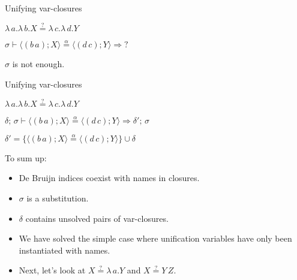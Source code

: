 \documentclass[pdf]{beamer}
\newcommand{\clos}[2] {
\langle #2; #1 \rangle
}
\newcommand{\app}[2] {
#1\, #2
}
\newcommand{\transition}[4] {
  $#1 \vdash #2 \stackrel{\alpha}{=} #3 \Rightarrow #4$
}
\newcommand{\eqha}[2] {
  #1\stackrel{?}{=}#2
}
\begin{document}
\begin{frame}{Unifying var-closures}

 {\centering
     $\eqha{\lambda\,a.\lambda\,b.X}{\lambda\,c.\lambda\,d.Y}$

    \vspace{1cm}
   \transition
    {\sigma}
    {\clos{X}{(b\,a)}}
    {\clos{Y}{(d\,c)}}
    {?}
    \par}
   
  \vspace{1cm}
  {\centering
   $\sigma$ is not enough.
 \par}
\end{frame}

\begin{frame}{Unifying var-closures}

 {\centering
    $\eqha{\lambda\,a.\lambda\,b.X}{\lambda\,c.\lambda\,d.Y}$

    \vspace{1cm}
   \transition
    {\delta;\,\sigma}
    {\clos{X}{(b\,a)}}
    {\clos{Y}{(d\,c)}}
    {\delta';\,\sigma}

    \vspace{1cm}
    $\delta' = \{\clos{X}{(b\,a)} \stackrel{\alpha}{=} \clos{Y}{(d\,c)}\}\cup\delta$
    \par}
\end{frame}

\begin{frame}{To sum up:}
  
  \begin{itemize}
  \item De Bruijn indices coexist with names in closures.
    
  \item $\sigma$ is a substitution.
    
  \item $\delta$ contains unsolved pairs of var-closures.
    
  \item We have solved the simple case where unification variables have only been instantiated with names.

  \item Next, let's look at $\eqha{X}{\lambda\,a.Y}$ and $\eqha{X}{\app{Y}{Z}}$.
  \end{itemize}
\end{frame}
\end{document}
